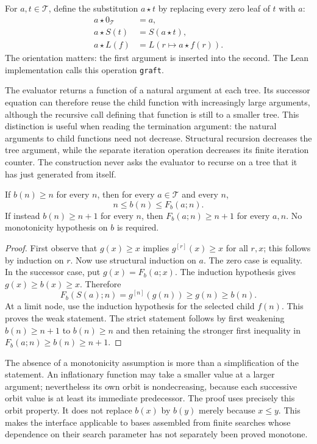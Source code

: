 For $a,t\in\mathcal T$, define the substitution $a\star t$ by replacing every
zero leaf of $t$ with $a$:
\begin{align*}
 a\star0_{\mathcal T}&=a,\\
 a\star S(t)&=S(a\star t),\\
 a\star L(f)&=L(r\mapsto a\star f(r)).
\end{align*}
The orientation matters: the first argument is inserted into the second.
The Lean implementation calls this operation \texttt{graft}.

The evaluator returns a function of a natural argument at each tree.  Its
successor equation can therefore reuse the child function with increasingly
large arguments, although the recursive call defining that function is
still to a smaller tree.  This distinction is useful when reading the
termination argument: the natural arguments to child functions need not
decrease.  Structural recursion decreases the tree argument, while the
separate iteration operation decreases its finite iteration counter.
The construction never asks the evaluator to recurse on a tree that it has
just generated from itself.

\begin{lemma}
\label{amp:lem:base}
If $b(n)\geq n$ for every $n$, then for every $a\in\mathcal T$ and every $n$,
\[
 n\leq b(n)\leq F_b(a;n).
\]
If instead $b(n)\geq n+1$ for every $n$, then
$F_b(a;n)\geq n+1$ for every $a,n$.
No monotonicity hypothesis on $b$ is required.
\end{lemma}

\begin{proof}
First observe that $g(x)\geq x$ implies $g^{[r]}(x)\geq x$ for all $r,x$;
this follows by induction on $r$.  Now use structural induction on $a$.
The zero case is equality.  In the successor case, put
$g(x)=F_b(a;x)$.  The induction hypothesis gives $g(x)\geq b(x)\geq x$.
Therefore
\[
 F_b(S(a);n)=g^{[n]}(g(n))\geq g(n)\geq b(n).
\]
At a limit node, use the induction hypothesis for the selected child $f(n)$.
This proves the weak statement.  The strict statement follows by first
weakening $b(n)\geq n+1$ to $b(n)\geq n$ and then retaining the stronger first
inequality in $F_b(a;n)\geq b(n)\geq n+1$.
\end{proof}

The absence of a monotonicity assumption is more than a simplification of
the statement.  An inflationary function may take a smaller value at a
larger argument; nevertheless its own orbit is nondecreasing, because each
successive orbit value is at least its immediate predecessor.  The proof
uses precisely this orbit property.  It does not replace $b(x)$ by $b(y)$
merely because $x\leq y$.  This makes the interface applicable to bases
assembled from finite searches whose dependence on their search parameter
has not separately been proved monotone.

